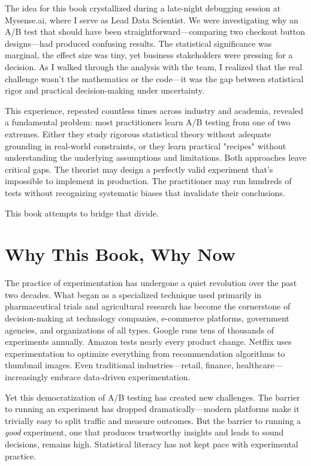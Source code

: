 The idea for this book crystallized during a late-night debugging session at Mysense.ai, where I serve as Lead Data Scientist. We were investigating why an A/B test that should have been straightforward—comparing two checkout button designs—had produced confusing results. The statistical significance was marginal, the effect size was tiny, yet business stakeholders were pressing for a decision. As I walked through the analysis with the team, I realized that the real challenge wasn't the mathematics or the code—it was the gap between statistical rigor and practical decision-making under uncertainty.

This experience, repeated countless times across industry and academia, revealed a fundamental problem: most practitioners learn A/B testing from one of two extremes. Either they study rigorous statistical theory without adequate grounding in real-world constraints, or they learn practical "recipes" without understanding the underlying assumptions and limitations. Both approaches leave critical gaps. The theorist may design a perfectly valid experiment that's impossible to implement in production. The practitioner may run hundreds of tests without recognizing systematic biases that invalidate their conclusions.

This book attempts to bridge that divide.

\section*{Why This Book, Why Now}

The practice of experimentation has undergone a quiet revolution over the past two decades. What began as a specialized technique used primarily in pharmaceutical trials and agricultural research has become the cornerstone of decision-making at technology companies, e-commerce platforms, government agencies, and organizations of all types. Google runs tens of thousands of experiments annually. Amazon tests nearly every product change. Netflix uses experimentation to optimize everything from recommendation algorithms to thumbnail images. Even traditional industries—retail, finance, healthcare—increasingly embrace data-driven experimentation.

Yet this democratization of A/B testing has created new challenges. The barrier to running an experiment has dropped dramatically—modern platforms make it trivially easy to split traffic and measure outcomes. But the barrier to running a \textit{good} experiment, one that produces trustworthy insights and leads to sound decisions, remains high. Statistical literacy has not kept pace with experimental practice.

